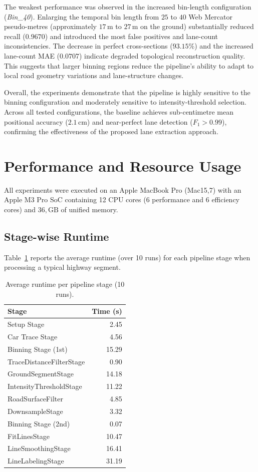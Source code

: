 The weakest performance was observed in the increased bin-length configuration (\textit{Bin\_40}). Enlarging the temporal bin length from $25$ to $40$ Web Mercator pseudo-metres (approximately $17\,\mathrm{m}$ to $27\,\mathrm{m}$ on the ground) substantially reduced recall ($0.9670$) and introduced the most false positives and lane-count inconsistencies. The decrease in perfect cross-sections ($93.15\%$) and the increased lane-count MAE ($0.0707$) indicate degraded topological reconstruction quality. This suggests that larger binning regions reduce the pipeline's ability to adapt to local road geometry variations and lane-structure changes.

Overall, the experiments demonstrate that the pipeline is highly sensitive to the binning configuration and moderately sensitive to intensity-threshold selection. Across all tested configurations, the baseline achieves sub-centimetre mean positional accuracy ($2.1\,\mathrm{cm}$) and near-perfect lane detection ($F_1 > 0.99$), confirming the effectiveness of the proposed lane extraction approach.

\FloatBarrier
\section{Performance and Resource Usage}
\label{sec:eval_performance}

All experiments were executed on an Apple MacBook Pro (Mac15,7) with an Apple M3 Pro SoC containing 12 CPU cores (6 performance and 6 efficiency cores) and $36,\mathrm{GB}$ of unified memory.

\subsection{Stage-wise Runtime}
Table~\ref{tab:stage_times} reports the average runtime (over 10 runs) for each pipeline stage when processing a typical highway segment.

\begin{table}[htbp]
  \centering
  \caption{Average runtime per pipeline stage (10 runs).}
  \label{tab:stage_times}
  \small
  \begin{tabular}{@{}lr@{}}
    \hline
    \textbf{Stage} & \textbf{Time (s)} \\
    \hline
    Setup Stage & 2.45 \\
    Car Trace Stage & 4.56 \\
    Binning Stage (1st) & 15.29 \\
    TraceDistanceFilterStage & 0.90 \\
    GroundSegmentStage & 14.18 \\
    IntensityThresholdStage & 11.22 \\
    RoadSurfaceFilter & 4.85 \\
    DownsampleStage & 3.32 \\
    Binning Stage (2nd) & 0.07 \\
    FitLinesStage & 10.47 \\
    LineSmoothingStage & 16.41 \\
    LineLabelingStage & 31.19 \\
    \hline
  \end{tabular}
\end{table}

